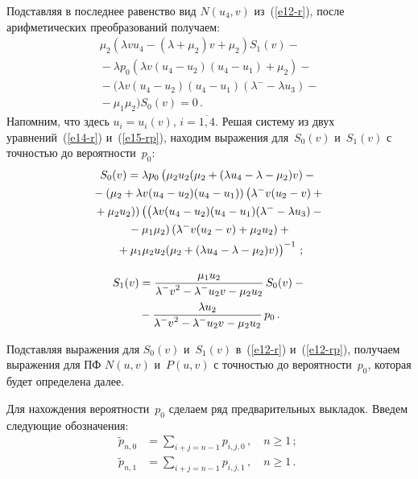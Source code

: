 \begin{multicols}{2}
Подставляя в последнее равенство вид $N(u_4,v)$ из~(\ref{e12-r}), 
после арифметических преобразований получаем:
\begin{multline}
\label{e15-rp}
\mu_2 (\lambda v u_4 - (\lambda +\mu_2)v + \mu_2)
S_1(v)-{}\\
{}-\lambda p_0 (\lambda v (u_4-u_2)(u_4-u_1)+\mu_2)-{}\\
{}- 
(\lambda v (u_4-u_2)(u_4-u_1)(\lambda^- - \lambda u_3)-{}\\
{}- \mu_1 \mu_2) S_0(v) = 0\,.
\end{multline}
Напомним, что здесь $u_i=u_i(v)$, $i =\overline{1,4}$.
Решая систему из двух уравнений~(\ref{e14-r}) и~(\ref{e15-rp}),
находим выражения для~$S_0(v)$ и~$S_1(v)$ с точностью до
вероятности~$p_0$:
\begin{multline}
\label{e15-rp1}
S_0(v) = \lambda p_0 \left ( \vphantom{\lambda^-_2}
\mu_2 u_2 (\mu_2 + (\lambda u_4 - \lambda - \mu_2)v)
- {}\right.\\
\left.{}-
(\mu_2+\lambda v (u_4-u_2)(u_4-u_1)) \left(\lambda^- v (u_2 -v) +{}\right.\right.\\
\left.\left.{}+ \mu_2 u_2\right)
\right )
\left (
\left(\lambda v (u_4-u_2)(u_4-u_1)(\lambda^- - \lambda u_3) - {}\right.\right.\\
\left.{}-\mu_1 \mu_2\right)
(\lambda^- v (u_2 -v) + \mu_2 u_2)
+{}
\\
\left.{}+
\mu_1 \mu_2 u_2 (\mu_2 + (\lambda u_4 - \lambda - \mu_2)v)
\vphantom{\lambda_2^-}
\right )^{-1}\,;
\end{multline}

\vspace*{-6pt}

\noindent
\begin{multline}
\label{e15-rp2}
S_1(v) = \displaystyle\frac{\displaystyle  \mu_1 u_2\mathstrut}{\displaystyle \lambda^- v^2 - \lambda^- u_2 v -  \mu_2 u_2\mathstrut}\,
S_0(v) -{}\\
{}- \displaystyle\frac{\displaystyle \lambda u_2\mathstrut}{\displaystyle \lambda^- v^2 - \lambda^- u_2 v -  \mu_2 u_2\mathstrut}\,
p_0 \,.
\end{multline}

Подставляя выражения для $S_0(v)$ и~$S_1(v)$ в~(\ref{e12-r})
и~(\ref{e12-rp}), получаем выражения для ПФ $N(u,v)$ и~$P(u,v)$
с точностью до вероятности~$p_0$, которая будет определена далее.

Для нахождения вероятности~$p_0$ сделаем ряд предварительных выкладок.
Введем следующие обозначения:
\begin{align*}
\tilde{p}_{n,0}&=\sum_{i+j=n-1} p_{i,j,0}\,, \quad n \ge 1\,; \ \\
\tilde{p}_{n,1}&= \sum_{i+j=n-1} p_{i,j,1}\,, \quad n \ge 1\,.
\end{align*}


\end{multicols}

